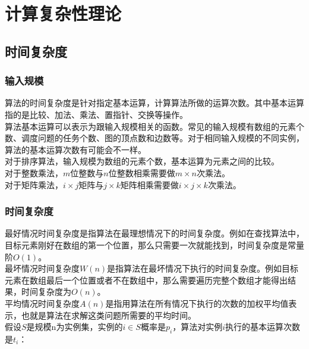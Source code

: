 \chapter{计算复杂性理论}

\section{时间复杂度}

\subsection{输入规模}

算法的时间复杂度是针对指定基本运算，计算算法所做的运算次数。其中基本运算指的是比较、加法、乘法、置指针、交换等操作。\\

算法基本运算可以表示为跟输入规模相关的函数。常见的输入规模有数组的元素个数、调度问题的任务个数、图的顶点数和边数等。对于相同输入规模的不同实例，算法的基本运算次数有可能会不一样。\\

对于排序算法，输入规模为数组的元素个数，基本运算为元素之间的比较。\\

对于整数乘法，$ m $位整数与$ n $位整数相乘需要做$ m \times n $次乘法。\\

对于矩阵乘法，$ i \times j $矩阵与$ j \times k $矩阵相乘需要做$ i \times j \times k $次乘法。\\

\subsection{时间复杂度}

最好情况时间复杂度是指算法在最理想情况下的时间复杂度。例如在查找算法中，目标元素刚好在数组的第一个位置，那么只需要一次就能找到，时间复杂度是常量阶$ O(1) $。\\

最坏情况时间复杂度$ W(n) $是指算法在最坏情况下执行的时间复杂度。例如目标元素在数组最后一个位置或者不在数组中，那么需要遍历完整个数组才能得出结果，时间复杂度为$ O(n) $。\\

平均情况时间复杂度$ A(n) $是指用算法在所有情况下执行的次数的加权平均值表示，也就是算法在求解这类问题所需要的平均时间。\\

假设$ S $是规模n为实例集，实例的$ i \in S $概率是$ p_i $，算法对实例$ i $执行的基本运算次数是$ t_i $：

